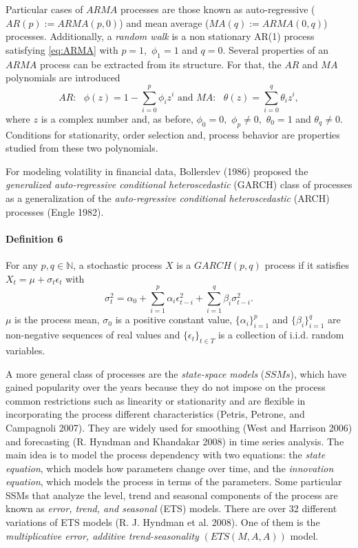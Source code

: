 Particular cases of \(ARMA\) processes are those known as auto-regressive (\(AR(p) := ARMA(p,0)\)) and mean average (\(MA(q) := ARMA(0,q)\)) processes. Additionally, a \emph{random walk} is a non stationary AR(1)
process satisfying \eqref{eq:ARMA} with \(p=1,\) \(\phi_1 = 1\) and \(q=0.\) Several properties of an \(ARMA\) process can be extracted from its structure. For that, the \(AR\) and \(MA\) polynomials are introduced
\[
 AR:\text{ } \phi(z) = 1-\sum_{i=0}^p \phi_i z^i \text{ and } MA:\text{ } \theta(z) = \sum_{i=0}^q \theta_i z^i,
\]
where \(z\) is a complex number and, as before, \(\phi_0 = 0,\) \(\phi_p\neq 0,\) \(\theta_0= 1\) and \(\theta_q\neq 0.\) Conditions for stationarity, order selection and, process behavior are properties studied from these two polynomials.

For modeling volatility in financial data, Bollerslev (1986) proposed the \emph{generalized auto-regressive conditional heteroscedastic} (GARCH) class of processes as a generalization of the \emph{auto-regressive conditional heteroscedastic} (ARCH) processes (Engle 1982).

\hypertarget{definition-6}{%
\paragraph{Definition 6}\label{definition-6}}

For any \(p,q \in \mathbb{N}\), a stochastic process \(X\) is a \(GARCH(p,q)\) process if it satisfies \(X_t = \mu + \sigma_{t}\epsilon_t\) with
\[
\sigma_t^2 = \alpha_0 +\sum_{i=1}^p\alpha_i \epsilon_{t-i}^2 +\sum_{i=1}^q \beta_{i}\sigma^2_{t-i}.
\]
\(\mu\) is the process mean, \(\sigma_0\) is a positive constant value, \(\{\alpha_i\}_{i=1}^p\) and \(\{\beta_i\}_{i=1}^q\) are non-negative sequences of real values and \(\{\epsilon_{t}\}_{t \in T}\) is a collection of i.i.d. random variables.

A more general class of processes are the \emph{state-space models} (\(SSMs\)), which have gained popularity over the years because they do not impose on the process common restrictions such as linearity or stationarity and are flexible in incorporating the process different characteristics (Petris, Petrone, and Campagnoli 2007). They are widely used for smoothing (West and Harrison 2006) and forecasting (R. Hyndman and Khandakar 2008) in time series analysis. The main idea is to model the process dependency with two equations: the \emph{state equation}, which models how parameters change over time, and the \emph{innovation equation}, which models the process in terms of the parameters. Some particular SSMs that analyze the level, trend and seasonal components of the process are known as \emph{error, trend, and seasonal} (ETS) models. There are over 32 different variations of ETS models (R. J. Hyndman et al. 2008). One of them is the \emph{multiplicative error, additive trend-seasonality} \((ETS(M,A,A))\) model.

